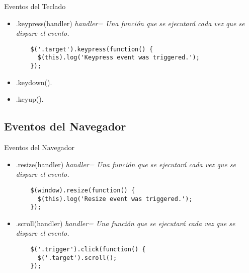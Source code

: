 \begin{frame}[fragile]{Eventos del Teclado} %
\begin{itemize}
    \item .keypress(handler) \textit{ handler= Una función que se ejecutará cada vez que se dispare el evento.}
    \begin{lstlisting}
    $('.target').keypress(function() {
      $(this).log('Keypress event was triggered.');
    });
    \end{lstlisting}
    \item .keydown().
    \item .keyup().
\end{itemize}
\end{frame}

\subsection{Eventos del Navegador} %

\begin{frame}[fragile]{Eventos del Navegador} %
\begin{itemize}
    \item .resize(handler) \textit{ handler= Una función que se ejecutará cada vez que se dispare el evento.}
    \begin{lstlisting}
    $(window).resize(function() {
      $(this).log('Resize event was triggered.');
    });
    \end{lstlisting}
    \item .scroll(handler) \textit{ handler= Una función que se ejecutará cada vez que se dispare el evento.} 
    \begin{lstlisting}
    $('.trigger').click(function() {
      $('.target').scroll();
    });
    \end{lstlisting}
\end{itemize}
\end{frame}


